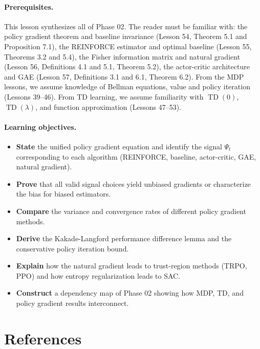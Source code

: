 \documentclass[11pt,a4paper]{article}
\begin{document}
\paragraph{Prerequisites.}
This lesson synthesizes all of Phase 02. The reader must be familiar
with: the policy gradient theorem and baseline invariance (Lesson 54,
Theorem 5.1 and Proposition 7.1), the REINFORCE estimator and optimal
baseline (Lesson 55, Theorems 3.2 and 5.4), the Fisher information
matrix and natural gradient (Lesson 56, Definitions 4.1 and 5.1,
Theorem 5.2), the actor-critic architecture and GAE (Lesson 57,
Definitions 3.1 and 6.1, Theorem 6.2). From the MDP lessons, we assume
knowledge of Bellman equations, value and policy iteration (Lessons
39--46). From TD learning, we assume familiarity with $\operatorname{TD}(0)$,
$\operatorname{TD}(\lambda)$, and function approximation (Lessons 47--53).

\paragraph{Learning objectives.}
\begin{itemize}
  \item \textbf{State} the unified policy gradient equation and identify
    the signal $\Psi_t$ corresponding to each algorithm (REINFORCE,
    baseline, actor-critic, GAE, natural gradient).
  \item \textbf{Prove} that all valid signal choices yield unbiased
    gradients or characterize the bias for biased estimators.
  \item \textbf{Compare} the variance and convergence rates of different
    policy gradient methods.
  \item \textbf{Derive} the Kakade-Langford performance difference
    lemma and the conservative policy iteration bound.
  \item \textbf{Explain} how the natural gradient leads to trust-region
    methods (TRPO, PPO) and how entropy regularization leads to SAC.
  \item \textbf{Construct} a dependency map of Phase 02 showing how
    MDP, TD, and policy gradient results interconnect.
\end{itemize}

\section{References}
\end{document}
